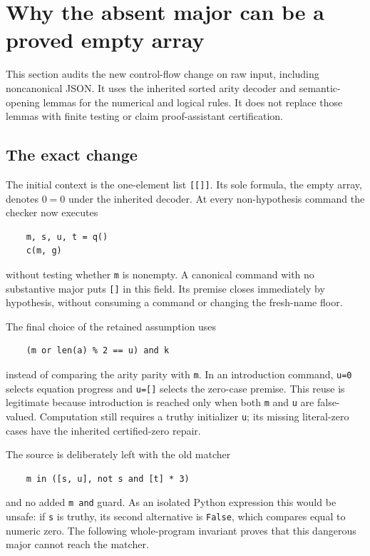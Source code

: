 \documentclass[11pt,letterpaper]{article}
\theoremstyle{definition}\newtheorem{definition}[theorem]{Definition}
\theoremstyle{remark}\newtheorem{remark}[theorem]{Remark}
\begin{document}

\section{Why the absent major can be a proved empty array}
\label{sec:neutral-major-audit}

This section audits the new control-flow change on raw input, including
noncanonical JSON.  It uses the inherited sorted arity decoder and
semantic-opening lemmas for the numerical and logical rules.  It does not
replace those lemmas with finite testing or claim proof-assistant
certification.

\subsection{The exact change}

The initial context is the one-element list \texttt{[[]]}.  Its sole
formula, the empty array, denotes $0=0$ under the inherited decoder.
At every non-hypothesis command the checker now executes
\begin{verbatim}
    m, s, u, t = q()
    c(m, g)
\end{verbatim}
without testing whether \texttt{m} is nonempty.  A canonical command with
no substantive major puts \texttt{[]} in this field.  Its premise closes
immediately by hypothesis, without consuming a command or changing the
fresh-name floor.

The final choice of the retained assumption uses
\begin{verbatim}
    (m or len(a) % 2 == u) and k
\end{verbatim}
instead of comparing the arity parity with \texttt{m}.  In an
introduction command, \texttt{u=0} selects equation progress and
\texttt{u=[]} selects the zero-case premise.  This reuse is legitimate
because introduction is reached only when both \texttt{m} and
\texttt{u} are false-valued.  Computation still requires a truthy
initializer \texttt{u}; its missing literal-zero cases have the
inherited certified-zero repair.

The source is deliberately left with the old matcher
\begin{verbatim}
    m in ([s, u], not s and [t] * 3)
\end{verbatim}
and no added \texttt{m and} guard.  As an isolated Python expression this
would be unsafe: if \texttt{s} is truthy, its second alternative is
\texttt{False}, which compares equal to numeric zero.  The following
whole-program invariant proves that this dangerous major cannot reach
the matcher.
\end{document}

